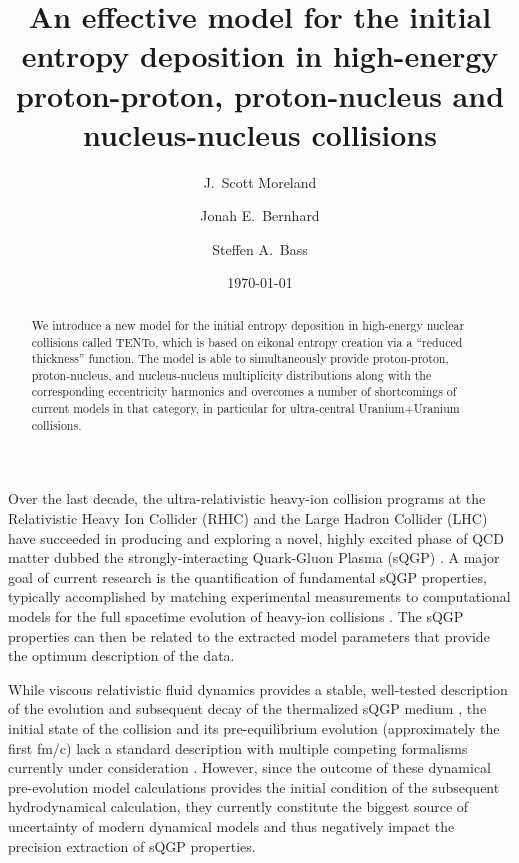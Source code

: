 \documentclass[aps,prc,reprint,amsmath,nofootinbib]{revtex4-1}
\newcommand{\trento}{T\raisebox{-.5ex}{R}ENTo}
\begin{document}
\title{An effective model for the initial entropy deposition in high-energy proton-proton, proton-nucleus and nucleus-nucleus collisions}

\author{J.\ Scott Moreland}
\author{Jonah E.\ Bernhard}
\author{Steffen A.\ Bass}

\date{\today}


\begin{abstract}
We introduce a new model for the initial entropy deposition in high-energy nuclear collisions called \trento, which is based on
eikonal entropy creation via a ``reduced thickness'' function.  
The model is able to simultaneously provide
proton-proton, proton-nucleus, and nucleus-nucleus multiplicity distributions along with  the corresponding eccentricity harmonics and overcomes a number of shortcomings of current models in that category, in particular for ultra-central Uranium+Uranium collisions.
\end{abstract}


\maketitle


Over the last decade, the ultra-relativistic heavy-ion collision programs at the Relativistic Heavy Ion Collider (RHIC) and the Large Hadron Collider (LHC) have succeeded in producing and exploring a novel, highly excited phase of QCD matter dubbed the strongly-interacting Quark-Gluon Plasma (sQGP)
\cite{Arsene:2004fa,Adcox:2004mh,Back:2004je,Adams:2005dq,Gyulassy:2004zy,Muller:2006ee,Muller:2012zq}.
A major goal of current research is the quantification of fundamental sQGP properties, typically accomplished by matching experimental measurements to computational models for the full spacetime evolution of heavy-ion collisions \cite{}. The sQGP properties can then be related to the extracted model parameters that provide the optimum description of the data.

While viscous relativistic fluid dynamics provides a stable, well-tested description of the evolution and subsequent decay of the thermalized sQGP medium \cite{Baier:2006gy,Song:2007ux,Luzum:2008cw,Schenke:2010rr,Shen:2011eg,Shen:2014vra}, the initial state of the collision and its pre-equilibrium evolution  (approximately the first fm/c) lack a standard description with multiple competing
formalisms currently under consideration \cite{}. However, since the outcome of these dynamical pre-evolution model calculations provides the initial condition of the subsequent hydrodynamical calculation, they currently constitute the biggest source of uncertainty of modern dynamical models \cite{Luzum:2008cw,Song:2010mg} and thus negatively impact the precision extraction of sQGP properties.
\end{document}
